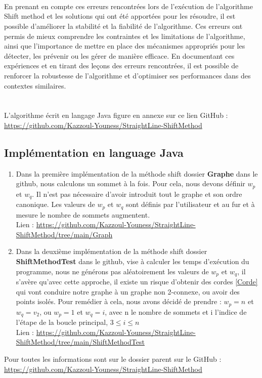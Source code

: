 \documentclass[hidelinks,letterpaper,12pt]{article}
\begin{document}
\\ \\ \\
En prenant en compte ces erreurs rencontrées lors de l'exécution de l'algorithme Shift method et les solutions qui ont été apportées pour les résoudre, il est possible d'améliorer la stabilité et la fiabilité de l'algorithme. Ces erreurs ont permis de mieux comprendre les contraintes et les limitations de l'algorithme, ainsi que l'importance de mettre en place des mécanismes appropriés pour les détecter, les prévenir ou les gérer de manière efficace. En documentant ces expériences et en tirant des leçons des erreurs rencontrées, il est possible de renforcer la robustesse de l'algorithme et d'optimiser ses performances dans des contextes similaires.
\\ \\ \\
L’algorithme écrit en langage Java figure en annexe sur ce lien GitHub : \\
\url{https://github.com/Kazzoul-Youness/StraightLine-ShiftMethod}


\newpage

\subsection{Implémentation en language Java}
\begin{enumerate}
   \item Dans la première implémentation de la méthode shift dossier \textbf{Graphe} dans le github, nous calculons un sommet à la fois. Pour cela, nous devons définir $w_p$ et $w_q$. Il n'est pas nécessaire d'avoir introduit tout le graphe et son ordre canonique. Les valeurs de $w_p$ et $w_q$ sont définis par l'utilisateur et au fur et à mesure le nombre de sommets augmentent.\\
Lien : \url{https://github.com/Kazzoul-Youness/StraightLine-ShiftMethod/tree/main/Graph}
\\ 
\item Dans la deuxième implémentation de la méthode shift dossier \textbf{ShiftMethodTest} dans le github, vise à calculer les temps d'exécution du programme, nous ne générons pas aléatoirement les valeurs de $w_p$ et $w_q$, il s'avère qu'avec cette approche, il existe un risque d'obtenir des cordes \ref{Corde} qui vont conduire notre graphe à un graphe non 2-connexe, ou avoir des points isolés. Pour remédier à cela, nous avons décidé de prendre : 
$w_p = n$ et $w_q = v_2$, ou $w_p = 1$ et $w_q = i$, avec n le nombre de sommets et i l'indice de l'étape de la boucle principal, \(  3 \leq i \leq n \) \\
Lien : \url{https://github.com/Kazzoul-Youness/StraightLine-ShiftMethod/tree/main/ShiftMethodTest} 
\end{enumerate}
Pour toutes les informations sont sur le dossier parent sur le GitHub : \url{https://github.com/Kazzoul-Youness/StraightLine-ShiftMethod}
\end{document}
